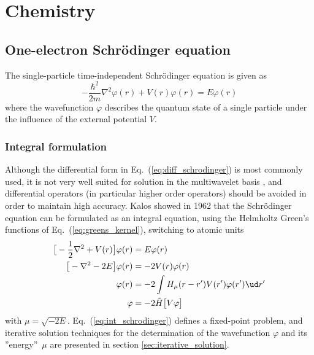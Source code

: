 \chapter{Chemistry}
\section{One-electron Schr\"{o}dinger equation}\label{sec:schrodinger}
The single-particle time-independent Schr\"{o}dinger equation is given as
\begin{equation}
    \label{eq:diff_schrodinger}
    -\frac{\hbar^2}{2m}\nabla^2\varphi(r) + V(r)\varphi(r) = E \varphi(r)
\end{equation}
where the wavefunction $\varphi$ describes the quantum state of a single 
particle under the influence of the external potential $V$. 

\subsection{Integral formulation}\label{sec:1_orb_int}
Although the differential form in Eq.~(\ref{eq:diff_schrodinger}) is most 
commonly used, it is not very well suited for solution in the multiwavelet 
basis \cite{Harrison}, and differential operators (in particular higher 
order operators) should be avoided in order to maintain high accuracy. 
Kalos \cite{Kalos} showed in 1962 that the Schr\"{o}dinger equation can 
be formulated as an integral equation, using the Helmholtz Green's functions 
of Eq.~(\ref{eq:greens_kernel}), switching to atomic units
\begin{align}
    \big[-\frac{1}{2}\nabla^2 + V(r)\big]\varphi(r) &= E \varphi(r)\\
    \big[-\nabla^2 - 2E\big]\varphi(r) &= -2V(r) \varphi(r)\\
    \varphi(r) &= -2\int H_{\mu}(r-r')V(r') \varphi(r') \ud r'\\
    \label{eq:int_schrodinger}
    \varphi &= -2 \hat{H}\big[V\varphi\big]
\end{align}
with $\mu = \sqrt{-2E}$. Eq.~(\ref{eq:int_schrodinger}) defines a fixed-point 
problem, and iterative solution techniques for the determination of the 
wavefunction $\varphi$ and its ''energy'' $\mu$ are presented in section 
\ref{sec:iterative_solution}.

